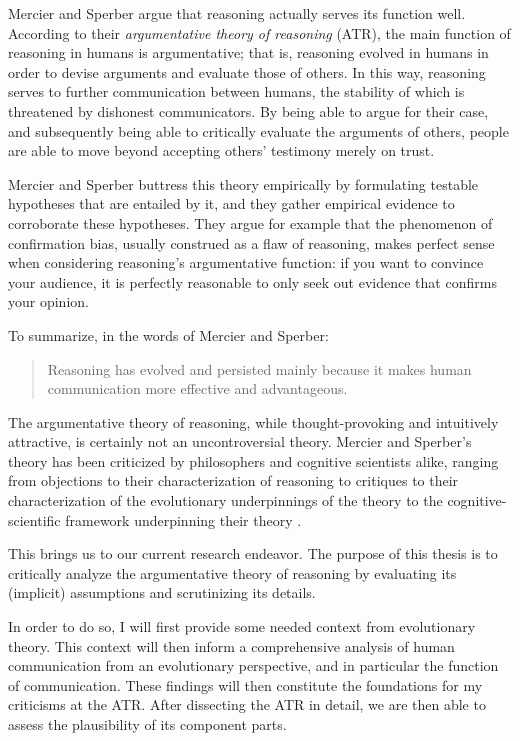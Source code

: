 Mercier and Sperber argue that reasoning actually serves its function well.
According to their \emph{argumentative theory of reasoning} (ATR), the main function of reasoning in humans is argumentative; that is, reasoning evolved in humans in order to devise arguments and evaluate those of others. In this way, reasoning serves to further communication between humans, the stability of which is threatened by dishonest communicators. By being able to argue for their case, and subsequently being able to critically evaluate the arguments of others, people are able to move beyond accepting others' testimony merely on trust.

Mercier and Sperber buttress this theory empirically by formulating testable hypotheses that are entailed by it, and they gather empirical evidence to corroborate these hypotheses. They argue for example that the phenomenon of confirmation bias, usually construed as a flaw of reasoning, makes perfect sense when considering reasoning's argumentative function: if you want to convince your audience, it is perfectly reasonable to only seek out evidence that confirms your opinion.

To summarize, in the words of Mercier and Sperber:
\begin{quote}
    Reasoning has evolved and persisted mainly because it makes human communication more effective and advantageous.
    \citep[p.~60]{MS11}
\end{quote}

The argumentative theory of reasoning, while thought-provoking and intuitively attractive, is certainly not an uncontroversial theory. Mercier and Sperber's theory has been criticized by philosophers and cognitive scientists alike, ranging from objections to their characterization of reasoning \citep{Koren23} to critiques to their characterization of the evolutionary underpinnings of the theory \citep{Dutilh18} to the cognitive-scientific framework underpinning their theory \citep{Sterelny18, Chater18}.


This brings us to our current research endeavor.
The purpose of this thesis is to critically analyze the argumentative theory of reasoning by evaluating its (implicit) assumptions and scrutinizing its details.

In order to do so, I will first provide some needed context from evolutionary theory. This context will then inform a comprehensive analysis of human communication from an evolutionary perspective, and in particular the function of communication. These findings will then constitute the foundations for my criticisms at the ATR.
After dissecting the ATR in detail, we are then able to assess the plausibility of its component parts.

